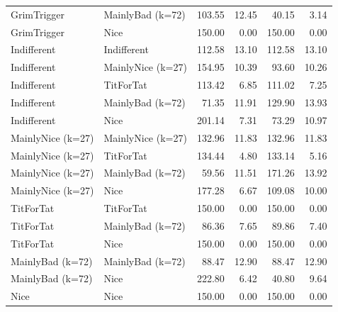 \documentclass[journal,a4paper,10pt,twoside]{IEEEtran} %
\begin{document}
\begin{tabular}{llrrrr}
          GrimTrigger &   MainlyBad (k=72) &  103.55 &   12.45 &   40.15 &    3.14 \\
          GrimTrigger &               Nice &  150.00 &    0.00 &  150.00 &    0.00 \\
          Indifferent &        Indifferent &  112.58 &   13.10 &  112.58 &   13.10 \\
          Indifferent &  MainlyNice (k=27) &  154.95 &   10.39 &   93.60 &   10.26 \\
          Indifferent &          TitForTat &  113.42 &    6.85 &  111.02 &    7.25 \\
          Indifferent &   MainlyBad (k=72) &   71.35 &   11.91 &  129.90 &   13.93 \\
          Indifferent &               Nice &  201.14 &    7.31 &   73.29 &   10.97 \\
    MainlyNice (k=27) &  MainlyNice (k=27) &  132.96 &   11.83 &  132.96 &   11.83 \\
    MainlyNice (k=27) &          TitForTat &  134.44 &    4.80 &  133.14 &    5.16 \\
    MainlyNice (k=27) &   MainlyBad (k=72) &   59.56 &   11.51 &  171.26 &   13.92 \\
    MainlyNice (k=27) &               Nice &  177.28 &    6.67 &  109.08 &   10.00 \\
            TitForTat &          TitForTat &  150.00 &    0.00 &  150.00 &    0.00 \\
            TitForTat &   MainlyBad (k=72) &   86.36 &    7.65 &   89.86 &    7.40 \\
            TitForTat &               Nice &  150.00 &    0.00 &  150.00 &    0.00 \\
     MainlyBad (k=72) &   MainlyBad (k=72) &   88.47 &   12.90 &   88.47 &   12.90 \\
     MainlyBad (k=72) &               Nice &  222.80 &    6.42 &   40.80 &    9.64 \\
                 Nice &               Nice &  150.00 &    0.00 &  150.00 &    0.00 \\ \bottomrule
\end{tabular}
\end{document}
